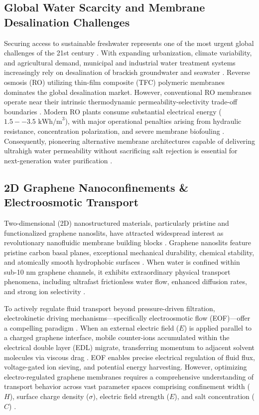 \documentclass[3p,preprint,12pt,numbers,square,sort&compress]{elsarticle}
\begin{document}
\subsection{Global Water Scarcity and Membrane Desalination Challenges}
Securing access to sustainable freshwater represents one of the most urgent global challenges of the 21st century \cite{rosentreter2024, tariqi2025}. With expanding urbanization, climate variability, and agricultural demand, municipal and industrial water treatment systems increasingly rely on desalination of brackish groundwater and seawater \cite{elimelech2011}. Reverse osmosis (RO) utilizing thin-film composite (TFC) polymeric membranes dominates the global desalination market. However, conventional RO membranes operate near their intrinsic thermodynamic permeability-selectivity trade-off boundaries \cite{arya2022}. Modern RO plants consume substantial electrical energy ($1.5--3.5\text{ kWh/m}^3$), with major operational penalties arising from hydraulic resistance, concentration polarization, and severe membrane biofouling \cite{zhang2023}. Consequently, pioneering alternative membrane architectures capable of delivering ultrahigh water permeability without sacrificing salt rejection is essential for next-generation water purification \cite{bocquet2020}.

\subsection{2D Graphene Nanoconfinements \& Electroosmotic Transport}
Two-dimensional (2D) nanostructured materials, particularly pristine and functionalized graphene nanoslits, have attracted widespread interest as revolutionary nanofluidic membrane building blocks \cite{liu2024, wang2024}. Graphene nanoslits feature pristine carbon basal planes, exceptional mechanical durability, chemical stability, and atomically smooth hydrophobic surfaces \cite{jung2017}. When water is confined within sub-10 nm graphene channels, it exhibits extraordinary physical transport phenomena, including ultrafast frictionless water flow, enhanced diffusion rates, and strong ion selectivity \cite{kavokine2021, agarwal2023}.

To actively regulate fluid transport beyond pressure-driven filtration, electrokinetic driving mechanisms---specifically electroosmotic flow (EOF)---offer a compelling paradigm \cite{liang2024, chaudhuri2025}. When an external electric field ($E$) is applied parallel to a charged graphene interface, mobile counter-ions accumulated within the electrical double layer (EDL) migrate, transferring momentum to adjacent solvent molecules via viscous drag \cite{cao2025}. EOF enables precise electrical regulation of fluid flux, voltage-gated ion sieving, and potential energy harvesting. However, optimizing electro-regulated graphene membranes requires a comprehensive understanding of transport behavior across vast parameter spaces comprising confinement width ($H$), surface charge density ($\sigma$), electric field strength ($E$), and salt concentration ($C$) \cite{zhao2023, zhang2025}.
\end{document}

